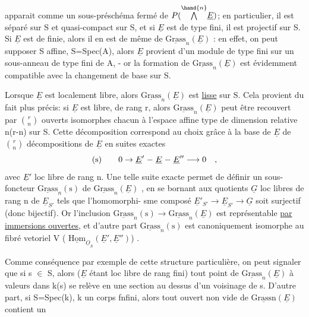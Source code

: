 
apparait comme un sous-préschéma fermé de $P(\overset{\hand{n}}{\bigwedge}\underline{E})$; en particulier, il
est séparé sur S et quasi-compact sur S, et  si $\underline{E}$  est de type fini,
il est projectif sur S. Si $\underline{E}$ est de  finie, alors
il en est de même de $\underline{\text{Grass}}_n(\underline{E})$ : en effet,  on peut
supposer S affine, S=Spec(A), alors $\underline{E}$ provient d'un module de type fini
sur un sous-anneau de type fini de A, -  or la formation de $\underline{\text{Grass}}_n(\underline{E})$
est évidemment compatible avec la changement de base sur S.

Lorsque $\underline{E}$  est localement libre, alors  $\underline{\text{Grass}}_n(\underline{E})$
est \uline{lisse} sur S. Cela provient du fait plus précis: si $\underline{E}$ est libre,
de rang r, alors  $\underline{\text{Grass}}_n(\underline{E})$  peut être recouvert par  $\binom{r}{n}$  ouverts
isomorphes chacun  à  l'espace affine type de dimension relative
n(r-n)  sur S.  Cette décomposition correspond au choix grâce à la base
de $\underline{E}$  de  $\binom{r}{n}$  décompositions de $\underline{E}$  en  suites
exactes
\[
\text{(s)} \qquad 0 \rightarrow \underline{E}' \relbar \underline{E} \relbar \underline{E}'' \longrightarrow 0 \quad ,
\]
avec $\underline{E}'$  loc libre de rang n.  Une telle suite exacte permet
de définir un sous-foncteur  $\underline{\text{Grass}}_n(\text{s})$  de  $\underline{\text{Grass}}_n(\underline{E})$ , en se bornant
aux  quotients  $\underline{G}$  loc libres de rang  n de  $\underline{E}_{S'}$  tels que l'homomorphi-%
sme composé  $\underline{E}'_{S'} \longrightarrow \underline{E}_{S'} \longrightarrow \underline{G}$  soit surjectif (donc bijectif). Or
l'inclusion  $\underline{\text{Grass}}_n(\text{s}) \rightarrow \underline{\text{Grass}}_n(\underline{E})$  est représentable \uline{par immersions
ouvertes}, et d'autre part  $\underline{\text{Grass}}_n(\text{s})$  est canoniquement isomorphe
au fibré vetoriel    V ( $\underline{\text{Hom}}_{\underline{O}_S}(\underline{E}',\underline{E}'')$) .

Comme conséquence par exemple de cette structure particulière,
on peut signaler que si s $\in$ S, alors ($\underline{E}$ étant loc libre de rang fini)
tout point de $\underline{\text{Grass}}_n(\underline{E})$  à valeurs dans k(s)  se relève en une section
au dessus d'un voisinage de s.  D'autre part, si S=Spec(k),  k
un corps fnfini, alors tout ouvert non vide de $\underline{\text{Grassn}}(\underline{E})$  contient un

